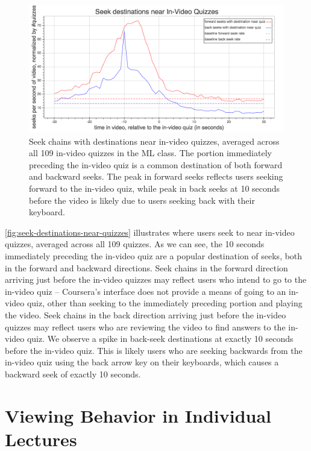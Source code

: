 \documentclass{sigchi}
\begin{document}
\begin{figure}
\includegraphics[width=1.0\columnwidth]{seek-destinations-near-quizzes}
\caption{Seek chains with destinations near in-video quizzes, averaged across all 109 in-video quizzes in the ML class. The portion immediately preceding the in-video quiz is a common destination of both forward and backward seeks. The peak in forward seeks reflects users seeking forward to the in-video quiz, while peak in back seeks at 10 seconds before the video is likely due to users seeking back with their keyboard.}
\label{fig:seek-destinations-near-quizzes}
\end{figure}

\autoref{fig:seek-destinations-near-quizzes} illustrates where users seek to near in-video quizzes, averaged across all 109 quizzes. As we can see, the 10 seconds immediately preceding the in-video quiz are a popular destination of seeks, both in the forward and backward directions. Seek chains in the forward direction arriving just before the in-video quizzes may reflect users who intend to go to the in-video quiz -- Coursera's interface does not provide a means of going to an in-video quiz, other than seeking to the immediately preceding portion and playing the video. Seek chains in the back direction arriving just before the in-video quizzes may reflect users who are reviewing the video to find answers to the in-video quiz. We observe a spike in back-seek destinations at exactly 10 seconds before the in-video quiz. This is likely users who are seeking backwards from the in-video quiz using the back arrow key on their keyboards, which causes a backward seek of exactly 10 seconds.

\section{Viewing Behavior in Individual Lectures}
\end{document}
